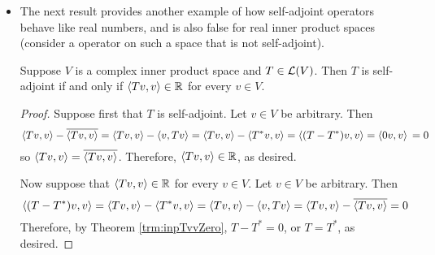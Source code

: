 \documentclass[../main.tex]{subfiles}
\begin{document}
\begin{itemize}
\begin{theorem}
        \begin{proof}
            Let $u\in V$ be arbitrary. By inner product algebra, we have that
            \begin{equation*}
                \inp{Tu}{w} = \frac{\inp{T(u+w)}{u+w}-\inp{T(u-w)}{u-w}}{4}+\frac{\inp{T(u+iw)}{u+iw}-\inp{T(u-iw)}{u-iw}}{4}i
            \end{equation*}
            for all $w\in V$. Since each term on the right-hand side of the above equation is of the form $\inp{Tv}{v}$ and we know by hypothesis that $\inp{Tv}{v}=0$ for all $v\in V$, we have that $\inp{Tu}{w}=0$ for all $w\in V$. In particular, if we let $w=Tu$, we learn that $\inp{Tu}{Tu}=0$, which implies that $Tu=0$. But this implies that $Tu=0$ for all $u\in V$, i.e., that $T=0$.
        \end{proof}
    \end{theorem}
    \item The next result provides another example of how self-adjoint operators behave like real numbers, and is also false for real inner product spaces (consider a operator on such a space that is not self-adjoint).
    \begin{theorem}
        Suppose $V$ is a complex inner product space and $T\in\mathcal{L}(V)$. Then $T$ is self-adjoint if and only if $\left\langle{Tv},{v}\right\rangle\in\mathbb{R}$ for every $v\in V$.
        \begin{proof}
            Suppose first that $T$ is self-adjoint. Let $v\in V$ be arbitrary. Then
            \begin{equation*}
                \left\langle{Tv},{v}\right\rangle-\overline{\left\langle{Tv},{v}\right\rangle} = \left\langle{Tv},{v}\right\rangle-\left\langle{v},{Tv}\right\rangle
                = \left\langle{Tv},{v}\right\rangle-\left\langle{T^*v},{v}\right\rangle
                = \left\langle{(T-T^*)v},{v}\right\rangle
                = \left\langle{0v},{v}\right\rangle\\
                = 0
            \end{equation*}
            so $\left\langle{Tv},{v}\right\rangle=\overline{\left\langle{Tv},{v}\right\rangle}$. Therefore, $\left\langle{Tv},{v}\right\rangle\in\mathbb{R}$, as desired.\par
            Now suppose that $\left\langle{Tv},{v}\right\rangle\in\mathbb{R}$ for every $v\in V$. Let $v\in V$ be arbitrary. Then
            \begin{equation*}
                \left\langle{(T-T^*)v},{v}\right\rangle = \left\langle{Tv},{v}\right\rangle-\left\langle{T^*v},{v}\right\rangle
                = \left\langle{Tv},{v}\right\rangle-\left\langle{v},{Tv}\right\rangle
                = \left\langle{Tv},{v}\right\rangle-\overline{\left\langle{Tv},{v}\right\rangle}
                = 0
            \end{equation*}
            Therefore, by Theorem \ref{trm:inpTvvZero}, $T-T^*=0$, or $T=T^*$, as desired.
        \end{proof}

\end{theorem}
\end{itemize}
\end{document}
